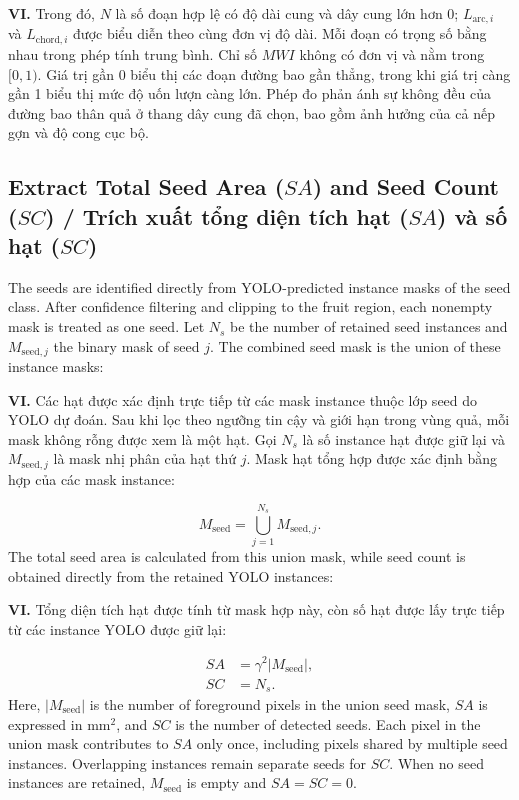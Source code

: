 \documentclass[final,1p,11pt,longtitle]{elsarticle}
\newenvironment{viet}{\par\smallskip\begingroup\color{viColor}\noindent\textbf{VI. }\ignorespaces}{\par\endgroup\smallskip}
\begin{document}
\begin{viet}
Trong đó, $N$ là số đoạn hợp lệ có độ dài cung và dây cung lớn hơn 0; $L_{\mathrm{arc},i}$ và $L_{\mathrm{chord},i}$ được biểu diễn theo cùng đơn vị độ dài. Mỗi đoạn có trọng số bằng nhau trong phép tính trung bình. Chỉ số $MWI$ không có đơn vị và nằm trong $[0,1)$. Giá trị gần 0 biểu thị các đoạn đường bao gần thẳng, trong khi giá trị càng gần 1 biểu thị mức độ uốn lượn càng lớn. Phép đo phản ánh sự không đều của đường bao thân quả ở thang dây cung đã chọn, bao gồm ảnh hưởng của cả nếp gợn và độ cong cục bộ.
\end{viet}

\subsection*{Extract Total Seed Area ($SA$) and Seed Count ($SC$) / {\color{viColor} Trích xuất tổng diện tích hạt ($SA$) và số hạt ($SC$)}}
The seeds are identified directly from YOLO-predicted instance masks of the seed class. After confidence filtering and clipping to the fruit region, each nonempty mask is treated as one seed. Let $N_s$ be the number of retained seed instances and $M_{\mathrm{seed},j}$ the binary mask of seed $j$. The combined seed mask is the union of these instance masks:

\begin{viet}
Các hạt được xác định trực tiếp từ các mask instance thuộc lớp seed do YOLO dự đoán. Sau khi lọc theo ngưỡng tin cậy và giới hạn trong vùng quả, mỗi mask không rỗng được xem là một hạt. Gọi $N_s$ là số instance hạt được giữ lại và $M_{\mathrm{seed},j}$ là mask nhị phân của hạt thứ $j$. Mask hạt tổng hợp được xác định bằng hợp của các mask instance:
\end{viet}

\begin{equation}
M_{\mathrm{seed}}=\bigcup_{j=1}^{N_s}M_{\mathrm{seed},j}.
\end{equation}
The total seed area is calculated from this union mask, while seed count is obtained directly from the retained YOLO instances:

\begin{viet}
Tổng diện tích hạt được tính từ mask hợp này, còn số hạt được lấy trực tiếp từ các instance YOLO được giữ lại:
\end{viet}

\begin{align}
SA&=\gamma^2|M_{\mathrm{seed}}|,\\
SC&=N_s.
\end{align}
Here, $|M_{\mathrm{seed}}|$ is the number of foreground pixels in the union seed mask, $SA$ is expressed in mm$^2$, and $SC$ is the number of detected seeds. Each pixel in the union mask contributes to $SA$ only once, including pixels shared by multiple seed instances. Overlapping instances remain separate seeds for $SC$. When no seed instances are retained, $M_{\mathrm{seed}}$ is empty and $SA=SC=0$.
\end{document}

